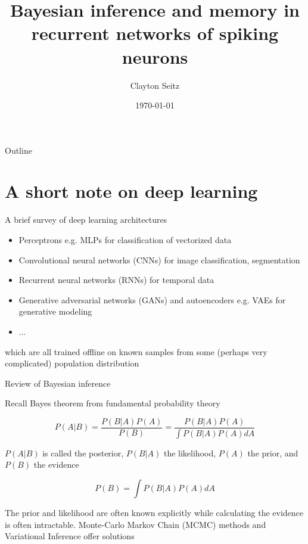 \documentclass[aspectratio=169]{beamer}
\begin{document}
\title{Bayesian inference and memory in recurrent networks of spiking neurons}  
\author{Clayton Seitz}
\date{\today} 

\maketitle


\begin{frame}{Outline}
\tableofcontents
\end{frame}

\section{A short note on deep learning}

\begin{frame}{A brief survey of deep learning architectures}

\begin{itemize}
\item Perceptrons e.g. MLPs for classification of vectorized data
\item Convolutional neural networks (CNNs) for image classification, segmentation
\item Recurrent neural networks (RNNs) for temporal data
\item Generative adversarial networks (GANs) and autoencoders e.g. VAEs for generative modeling
\item ...
\end{itemize}

\vfill
{\color{red} which are all trained offline on known samples from some (perhaps very complicated) population distribution}

\end{frame}

\begin{frame}{Review of Bayesian inference}

Recall Bayes theorem from fundamental probability theory

\begin{equation*}
P(A|B) = \frac{P(B|A)P(A)}{P(B)} = \frac{P(B|A)P(A)}{\int P(B|A)P(A)dA}
\end{equation*}
\vfill

$P(A|B)$ is called the posterior, $P(B|A)$ the likelihood, $P(A)$ the prior, and $P(B)$ the evidence
\vfill

\begin{equation*}
P(B) = \int P(B|A)P(A)dA
\end{equation*}

The prior and likelihood are often known explicitly while calculating the evidence is often intractable. Monte-Carlo Markov Chain (MCMC) methods and Variational Inference offer solutions

\end{frame}
\end{document}
